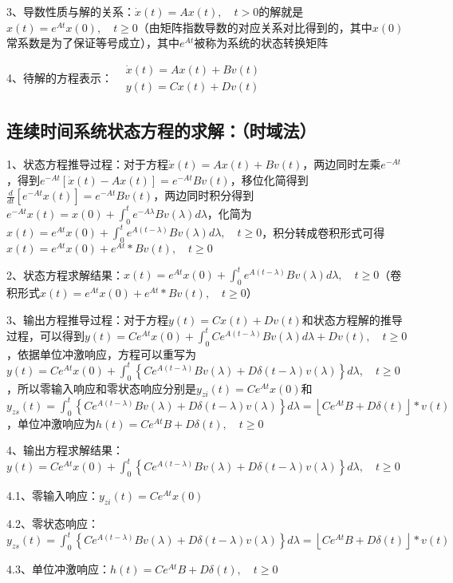 3、导数性质与解的关系：$\dot{x}(t)=A x(t), \quad t>0$的解就是$x(t)=e^{A t} x(0), \quad t \geq 0$（由矩阵指数导数的对应关系对比得到的，其中$x(0)$常系数是为了保证等号成立），其中$e^{A t}$被称为系统的状态转换矩阵

4、待解的方程表示：$\begin{aligned}&\dot{x}(t)=A x(t)+B v(t) \\&y(t)=C x(t)+D v(t)\end{aligned}$



\subsection{连续时间系统状态方程的求解：（时域法）}

1、状态方程推导过程：对于方程$\dot{x}(t)=A x(t)+B v(t)$，两边同时左乘$e^{-A t}$，得到$e^{-A t}[\dot{x}(t)-A x(t)]=e^{-A t} B v(t)$，移位化简得到$\frac{d}{d t}\left[e^{-A t} x(t)\right]=e^{-A t} B v(t)$，两边同时积分得到$e^{-A t} x(t)=x(0)+\int_{0}^{t} e^{-A \lambda} B v(\lambda) d \lambda$，化简为$x(t)=e^{A t} x(0)+\int_{0}^{t} e^{A(t-\lambda)} B v(\lambda) d \lambda, \quad t \geq 0$，积分转成卷积形式可得$x(t)=e^{A t} x(0)+e^{A t} * B v(t), \quad t \geq 0$

2、状态方程求解结果：$x(t)=e^{A t} x(0)+\int_{0}^{t} e^{A(t-\lambda)} B v(\lambda) d \lambda, \quad t \geq 0$（卷积形式$x(t)=e^{A t} x(0)+e^{A t} * B v(t), \quad t \geq 0$）

3、输出方程推导过程：对于方程$y(t)=C x(t)+D v(t)$和状态方程解的推导过程，可以得到$y(t)=C e^{A t} x(0)+\int_{0}^{t} C e^{A(t-\lambda)} B v(\lambda) d \lambda+D v(t), \quad t \geq 0$，依据单位冲激响应，方程可以重写为$y(t)=C e^{A t} x(0)+\int_{0}^{t}\left\{C e^{A(t-\lambda)} B v(\lambda)+D \delta(t-\lambda) v(\lambda)\right\} d \lambda, \quad t \geq 0$，所以零输入响应和零状态响应分别是$y_{z i}(t)=C e^{A t} x(0)$和$y_{z s}(t)=\int_{0}^{t}\left\{C e^{A(t-\lambda)} B v(\lambda)+D \delta(t-\lambda) v(\lambda)\right\} d \lambda=\left\lfloor C e^{A t} B+D \delta(t)\right\rfloor * v(t)$，单位冲激响应为$h(t)=C e^{A t} B+D \delta(t), \quad t \geq 0$

4、输出方程求解结果：$y(t)=C e^{A t} x(0)+\int_{0}^{t}\left\{C e^{A(t-\lambda)} B v(\lambda)+D \delta(t-\lambda) v(\lambda)\right\} d \lambda, \quad t \geq 0$

4.1、零输入响应：$y_{z i}(t)=C e^{A t} x(0)$

4.2、零状态响应：$y_{z s}(t)=\int_{0}^{t}\left\{C e^{A(t-\lambda)} B v(\lambda)+D \delta(t-\lambda) v(\lambda)\right\} d \lambda=\left\lfloor C e^{A t} B+D \delta(t)\right\rfloor * v(t)$

4.3、单位冲激响应：$h(t)=C e^{A t} B+D \delta(t), \quad t \geq 0$

